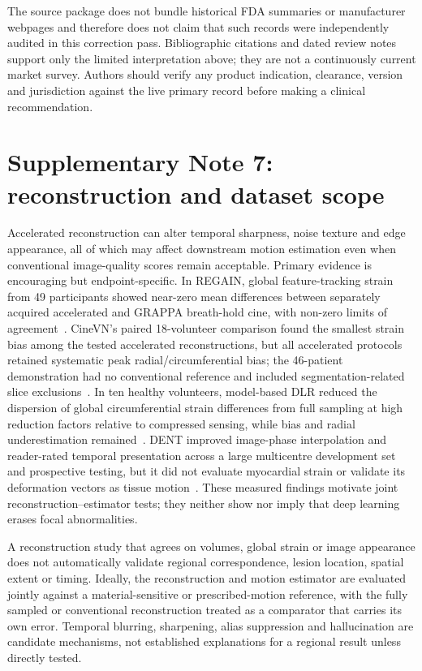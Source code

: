 \documentclass[11pt,a4paper]{article}
\begin{document}
The source package does not bundle historical FDA summaries or manufacturer webpages and therefore does not claim that such records were independently audited in this correction pass. Bibliographic citations and dated review notes support only the limited interpretation above; they are not a continuously current market survey. Authors should verify any product indication, clearance, version and jurisdiction against the live primary record before making a clinical recommendation.

\section*{Supplementary Note 7: reconstruction and dataset scope}

Accelerated reconstruction can alter temporal sharpness, noise texture and edge appearance, all of which may affect downstream motion estimation even when conventional image-quality scores remain acceptable. Primary evidence is encouraging but endpoint-specific. In REGAIN, global feature-tracking strain from 49 participants showed near-zero mean differences between separately acquired accelerated and GRAPPA breath-hold cine, with non-zero limits of agreement~\cite{yoon2023regain}. CineVN's paired 18-volunteer comparison found the smallest strain bias among the tested accelerated reconstructions, but all accelerated protocols retained systematic peak radial/circumferential bias; the 46-patient demonstration had no conventional reference and included segmentation-related slice exclusions~\cite{vornehm2024cinevn}. In ten healthy volunteers, model-based DLR reduced the dispersion of global circumferential strain differences from full sampling at high reduction factors relative to compressed sensing, while bias and radial underestimation remained~\cite{tsuneta2025dlr}. DENT improved image-phase interpolation and reader-rated temporal presentation across a large multicentre development set and prospective testing, but it did not evaluate myocardial strain or validate its deformation vectors as tissue motion~\cite{morales2024dent}. These measured findings motivate joint reconstruction--estimator tests; they neither show nor imply that deep learning erases focal abnormalities.

A reconstruction study that agrees on volumes, global strain or image appearance does not automatically validate regional correspondence, lesion location, spatial extent or timing. Ideally, the reconstruction and motion estimator are evaluated jointly against a material-sensitive or prescribed-motion reference, with the fully sampled or conventional reconstruction treated as a comparator that carries its own error. Temporal blurring, sharpening, alias suppression and hallucination are candidate mechanisms, not established explanations for a regional result unless directly tested.
\end{document}
